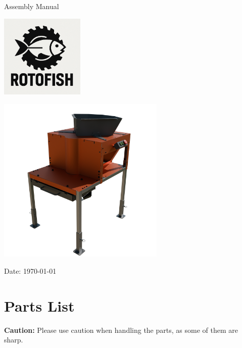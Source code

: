 \documentclass[a5paper,portrait]{article}
\begin{document}
\begin{titlepage}
    \hfill
    \centering
    \vspace*{2cm}
    {\color{mainblue}\sffamily\Huge Assembly Manual}\\[1cm]
    \begin{center}
        \includegraphics[width=0.3\textwidth]{../images/logo.png}
    \end{center}
    \begin{center}
        \includegraphics[width=0.6\textwidth]{../images/general_vue.png}
    \end{center}
    \vfill
    {\color{mainblue}\large Date: \today}
\end{titlepage}

\newpage

\newpage

\section*{Parts List}
\begin{tcolorbox}[colback=lightgray, colframe=accent, sharp corners, boxrule=0.5pt, left=2mm, right=2mm, top=1mm, bottom=1mm]
\textbf{Caution:} Please use caution when handling the parts, as some of them are sharp.
\end{tcolorbox}

\vspace{1em}
\end{document}
